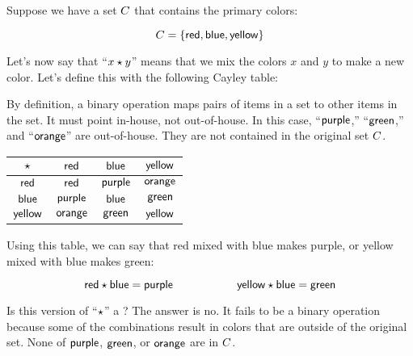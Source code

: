 \documentclass[../../../main.tex]{subfiles}
\begin{document}
\begin{fexample}

Suppose we have a set $C$ that contains the primary colors:

\begin{equation*}
  C = \{ \mathsf{red}, \mathsf{blue}, \mathsf{yellow} \}
\end{equation*}

Let's now say that ``$\op{x}{y}$'' means that we mix the colors $x$ and $y$ to make a new color. Let's define this with the following Cayley table:

\begin{aside}
  \begin{remark}
    By definition, a binary operation maps pairs of items in a set to other items in the  set. It must point in-house, not out-of-house. In this case, ``$\mathsf{purple}$,'' ``$\mathsf{green}$,'' and ``$\mathsf{orange}$'' are out-of-house. They are not contained in the original set $C$.
  \end{remark}
\end{aside}

\begin{center}
  \begin{tabular}{| c || c | c | c | }
    \hline
    $\opSymbol/$ & $\mathsf{red}$    & $\mathsf{blue}$   & $\mathsf{yellow}$ \\ \hline \hline
    $\mathsf{red}$    & $\mathsf{red}$    & $\mathsf{purple}$ & $\mathsf{orange}$ \\ \hline
    $\mathsf{blue}$   & $\mathsf{purple}$ & $\mathsf{blue}$   & $\mathsf{green}$  \\ \hline
    $\mathsf{yellow}$ & $\mathsf{orange}$ & $\mathsf{green}$  & $\mathsf{yellow}$ \\ \hline
  \end{tabular}
\end{center}

Using this table, we can say that red mixed with blue makes purple, or yellow mixed with blue makes green:

\begin{equation*}
  \op{\e{red}}{\e{blue}} = \e{purple} \hskip 2cm \op{\e{yellow}}{\e{blue}} = \e{green}
\end{equation*}

Is this version of ``$\opSymbol/$'' a ? The answer is no. It fails to be a binary operation because some of the combinations result in colors that are outside of the original set. None of $\mathsf{purple}$, $\mathsf{green}$, or $\mathsf{orange}$ are in $C$.

\end{fexample}
\end{document}
